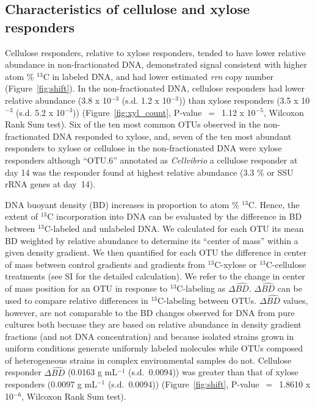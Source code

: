 \subsection{Characteristics of cellulose and xylose responders}
Cellulose responders, relative to xylose responders, tended to have lower
relative abundance in non-fractionated DNA, demonstrated signal consistent with
higher atom \% $^{13}$C in labeled DNA, and had lower estimated \textit{rrn}
copy number (Figure~\ref{fig:shift}). In the non-fractionated DNA, cellulose
responders had lower relative abundance (3.8 x 10$^{-3}$ (s.d. 1.2
x 10$^{-3}$)) than xylose responders (3.5 x 10$^{-3}$ (s.d. 5.2 x 10$^{-3}$))
(Figure~\ref{fig:xyl_count}, P-value~$=$~1.12 x 10$^{-5}$, Wilcoxon Rank
Sum test). Six of the ten most common OTUs observed in the non-fractionated DNA
responded to xylose, and, seven of the ten most abundant responders to xylose
or cellulose in the non-fractionated DNA were xylose responders although
``OTU.6'' annotated as \textit{Cellvibrio} a cellulose responder at day 14 was
the responder found at highest relative abundance (3.3 \% or SSU rRNA genes at
day~14).

DNA buoyant density (BD) increases in proportion to atom \% $^{13}$C.
Hence, the extent of $^{13}$C incorporation into DNA can be evaluated by
the difference in BD between $^{13}$C-labeled and unlabeled DNA. We
calculated for each OTU its mean BD weighted by relative abundance to
determine its ``center of mass'' within a given density gradient. We then
quantified for each OTU the difference in center of mass between control
gradients and gradients from $^{13}$C-xylose or $^{13}$C-cellulose
treatments (see SI for the detailed calculation). We refer to the change
in center of mass position for an OTU in response to $^{13}$C-labeling as
$\Delta\hat{BD}$. $\Delta\hat{BD}$ can be used to compare relative
differences in $^{13}$C-labeling between OTUs. $\Delta\hat{BD}$ values,
however, are not comparable to the BD changes observed for DNA from pure
cultures both becuase they are  based on relative
abundance in density gradient fractions (and not DNA concentration) and
because isolated strains grown in uniform conditions generate uniformly
labeled molecules while OTUs composed of heterogeneous strains in complex
environmental samples do not. Cellulose responder $\Delta\hat{BD}$
(0.0163 g mL$^{-1}$ (s.d.~0.0094)) was greater than that of xylose
responders (0.0097 g mL$^{-1}$ (s.d.~0.0094)) (Figure~\ref{fig:shift},
P-value~$=$~1.8610 x 10$^{-6}$, Wilcoxon Rank Sum test). 

